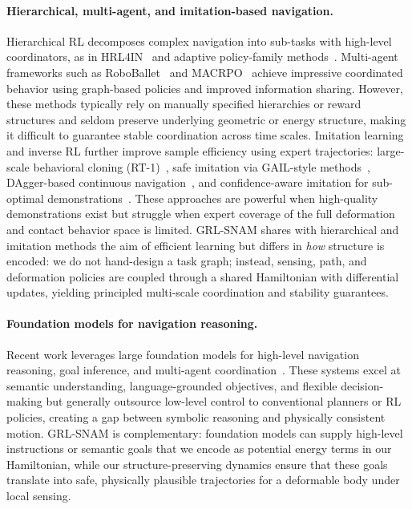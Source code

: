 \paragraph{Hierarchical, multi-agent, and imitation-based navigation.}
Hierarchical RL decomposes complex navigation into sub-tasks with high-level coordinators, as in HRL4IN~\citep{li2020hrl4in} and adaptive policy-family methods~\citep{lee2023adaptive}. Multi-agent frameworks such as RoboBallet~\citep{lai2025roboballet} and MACRPO~\citep{macrpo2024} achieve impressive coordinated behavior using graph-based policies and improved information sharing. However, these methods typically rely on manually specified hierarchies or reward structures and seldom preserve underlying geometric or energy structure, making it difficult to guarantee stable coordination across time scales. Imitation learning and inverse RL further improve sample efficiency using expert trajectories: large-scale behavioral cloning (RT-1)~\citep{brohan2022rt1}, safe imitation via GAIL-style methods~\citep{gail2024safe}, DAgger-based continuous navigation~\citep{shi2025dagger}, and confidence-aware imitation for sub-optimal demonstrations~\citep{confident2024il}. These approaches are powerful when high-quality demonstrations exist but struggle when expert coverage of the full deformation and contact behavior space is limited. GRL-SNAM shares with hierarchical and imitation methods the aim of efficient learning but differs in \emph{how} structure is encoded: we do not hand-design a task graph; instead, sensing, path, and deformation policies are coupled through a shared Hamiltonian with differential updates, yielding principled multi-scale coordination and stability guarantees.

\paragraph{Foundation models for navigation reasoning.}
Recent work leverages large foundation models for high-level navigation reasoning, goal inference, and multi-agent coordination~\citep{zhu2024navi2gazeleveragingfoundationmodels,llm2025nav}. These systems excel at semantic understanding, language-grounded objectives, and flexible decision-making but generally outsource low-level control to conventional planners or RL policies, creating a gap between symbolic reasoning and physically consistent motion. GRL-SNAM is complementary: foundation models can supply high-level instructions or semantic goals that we encode as potential energy terms in our Hamiltonian, while our structure-preserving dynamics ensure that these goals translate into safe, physically plausible trajectories for a deformable body under local sensing.

